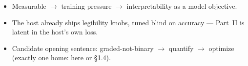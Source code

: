 \begin{itemize}
    \item Measurable $\to$ training pressure $\to$ interpretability as a model objective.
    \item The host already ships legibility knobs, tuned blind on accuracy — Part~II is latent in the host's own loss. 
    \item Candidate opening sentence: graded-not-binary $\to$ quantify $\to$ optimize (exactly one home: here or §1.4). 

\end{itemize}
